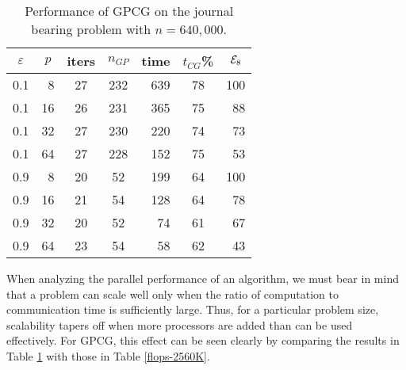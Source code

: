 \begin{table}[htbp]
\caption{Performance of GPCG on the journal bearing problem
with $ n = 640,000 $.}
\label{flops-640K}
\begin{center}
\footnotesize
\begin{tabular}{| c r | c c r c r |}
\hline
\multicolumn{1}{|c}{$ \varepsilon $} & 
\multicolumn{1}{c|}{$ p $} & 
\multicolumn{1}{c}{iters} &
\multicolumn{1}{c}{$n_{GP}$} & 
\multicolumn{1}{c}{time} &
\multicolumn{1}{c}{$t_{CG}$\%} & 
\multicolumn{1}{c|}{$ {\cal E}_8 $} \\ \hline
0.1  & 8 & 27 & 232 & 639 & 78 & 100 \\
0.1  & 16 & 26 & 231 & 365 & 75 & 88 \\ 
0.1  & 32 & 27 & 230 & 220 & 74 & 73 \\
0.1  & 64 & 27 & 228 & 152 & 75 & 53 \\
\hline
0.9  & 8 & 20 & 52 & 199 & 64 & 100 \\
0.9  & 16 & 21 & 54 & 128 & 64 & 78 \\
0.9  & 32 & 20 & 52 & 74 & 61 & 67 \\
0.9  & 64 & 23 & 54 & 58 & 62 & 43 \\
\hline

\end{tabular}
\end{center}
\end{table}

When analyzing the parallel performance of an algorithm, we must bear
in mind that a problem can scale well only when the ratio of
computation to communication time is sufficiently large.  Thus, for a
particular problem size, scalability tapers off when more processors
are added than can be used effectively.  For GPCG, this effect can be
seen clearly by comparing the results in Table \ref{flops-640K} with
those in Table \ref{flops-2560K}.

